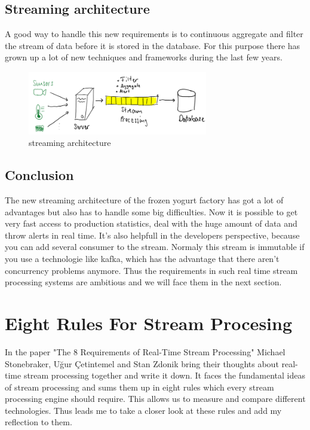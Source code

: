 \subsection{Streaming architecture}
A good way to handle this new requirements is to continuous aggregate and filter the stream of data before it is stored in the database.
For this purpose there has grown up a lot of new techniques and frameworks during the last few years.

\begin{figure}[H]
\centering
\captionsetup{justification=centering}
\includegraphics[width=0.7\textwidth]{images/stream.png}
\caption[streaming architecture]{streaming architecture}
\end{figure}

\newpage

\subsection{Conclusion}
The new streaming architecture of the frozen yogurt factory has got a lot of advantages but also has to handle some big difficulties.
Now it is possible to get very fast access to production statistics, deal with the huge amount of data and throw alerts in real time.
It's also helpfull in the developers perspective, because you can add several consumer to the stream.
Normaly this stream is immutable if you use a technologie like kafka, which has the advantage that there aren't concurrency problems anymore.
Thus the requirements in such real time stream processing systems are ambitious and we will face them in the next section.

\newpage

\section{Eight Rules For Stream Procesing}
In the paper "The 8 Requirements of Real-Time Stream Processing" Michael Stonebraker, Uğur Çetintemel and Stan Zdonik
bring their thoughts about real-time stream processing together and write it down. It faces the fundamental ideas of stream processing
and sums them up in eight rules which every stream processing engine should require.
This allows us to measure and compare different technologies.
Thus leads me to take a closer look at these rules and add my reflection to them.

